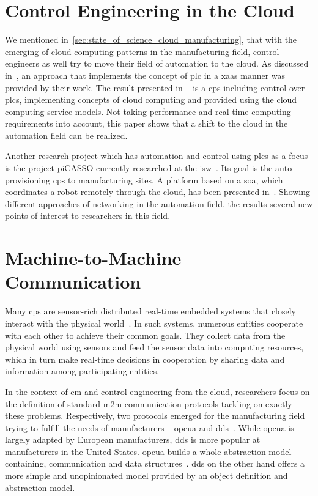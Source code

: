 \documentclass[
a4paper,
twoside,
headsepline,
cleardoublepage=empty,
parskip=half,
draft=false
]{scrbook}
\begin{document}
	\newpage

		\section{Control Engineering in the Cloud}\label{sec:control_engineering_in_the_cloud}

			We mentioned in~\cref{sec:state_of_science_cloud_manufacturing}, that with the emerging of cloud computing patterns in the manufacturing field, control engineers as well try to move their field of automation to the cloud.
			As discussed in~\cite{jazdi2014cyber}, an approach that implements the concept of \gls{plc} in a \gls{xaas} manner was provided by their work. 
			The result presented in ~\cite{jazdi2014cyber} is a \gls{cps} including control over \gls{plc}s, implementing concepts of cloud computing and provided using the cloud computing service models. 
			Not taking performance and real-time computing requirements into account, this paper shows that a shift to the cloud in the automation field can be realized.
			
			Another research project which has automation and control using \gls{plc}s as a focus is the project piCASSO currently researched at the \gls{isw}~\cite{kretschmer2016communication}.
			Its goal is the auto-provisioning \gls{cps} to manufacturing sites.
			A platform based on a \gls{soa}, which coordinates a robot remotely through the cloud, has been presented in~\cite{kretschmer2016communication}. 
			Showing different approaches of networking in the automation field, the results several new points of interest to researchers in this field.

		\section{Machine-to-Machine Communication}\label{sec:machine_to_machine_communication}
			
			Many \gls{cps} are sensor-rich distributed real-time embedded systems that closely interact with the physical world~\cite{kang2012rdds}. 
			In such systems, numerous entities cooperate with each other to achieve their common goals. 
			They collect data from the physical world using sensors and feed the sensor data into computing resources, which in turn make real-time decisions in cooperation by sharing data and information among participating entities.
			
			In the context of \gls{cm} and control engineering from the cloud, researchers focus on the definition of standard \gls{m2m} communication protocols tackling on exactly these problems.
			Respectively, two protocols emerged for the manufacturing field trying to fulfill the needs of manufacturers -- \gls{opcua} and \gls{dds}~\cite{jazdi2014cyber}.
			While \gls{opcua} is largely adapted by European manufacturers, \gls{dds} is more popular at manufacturers in the United States.
			\gls{opcua} builds a whole abstraction model containing, communication and data structures~\cite{candido2010soa}.
			\gls{dds} on the other hand offers a more simple and unopinionated model provided by an object definition and abstraction model.
\end{document}
